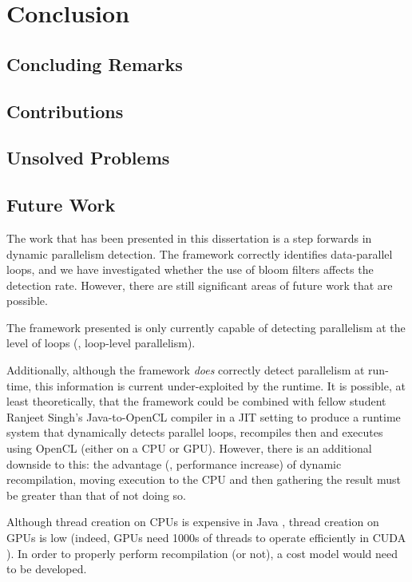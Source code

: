 \chapter{Conclusion} \label{chp:conclusion}
\section{Concluding Remarks} \label{sec:conclusion/remarks}

\section{Contributions} \label{sec:conclusion/contributions}

\section{Unsolved Problems} \label{sec:conclusion/unsolved}

\section{Future Work} \label{sec:conclusion/future-work}
The work that has been presented in this dissertation is a step forwards in dynamic parallelism detection. The framework correctly identifies data-parallel loops, and we have investigated whether the use of bloom filters affects the detection rate. However, there are still significant areas of future work that are possible.

The framework presented is only currently capable of detecting parallelism at the level of loops (\ie, loop-level parallelism). 

Additionally, although the framework \emph{does} correctly detect parallelism at run-time, this information is current under-exploited by the runtime. It is possible, at least theoretically, that the framework could be combined with fellow student Ranjeet Singh's Java-to-OpenCL compiler in a JIT setting to produce a runtime system that dynamically detects parallel loops, recompiles then and executes using OpenCL (either on a CPU or GPU). However, there is an additional downside to this: the advantage (\ie, performance increase) of dynamic recompilation, moving execution to the CPU and then gathering the result must be greater than that of not doing so.

Although thread creation on CPUs is expensive in Java \citep{JSR133}, thread creation on GPUs is low \citep{Mueller2009} (indeed, GPUs need 1000s of threads to operate efficiently in CUDA \citep{Nvidia2011}). In order to properly perform recompilation (or not), a cost model would need to be developed.